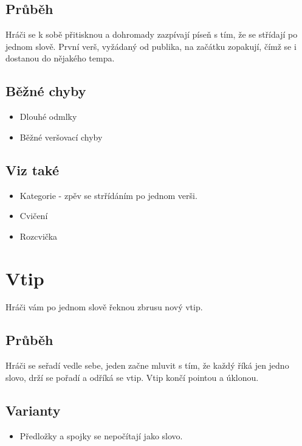 \documentclass[main.tex]{subfiles}
\begin{document}
\subsection{Průběh} Hráči se k sobě přitisknou a dohromady zazpívají píseň s tím, že se střídají po jednom slově. První verš, vyžádaný od publika, na začátku zopakují, čímž se i dostanou do nějakého tempa.  
 
\subsection{Běžné chyby} \begin{itemize}
\item Dlouhé odmlky
\item Běžné veršovací chyby
\end{itemize}
 
\subsection{Viz také} \begin{itemize}
\item Kategorie  - zpěv se strřídáním po jednom verši.
\item Cvičení 
\item Rozcvička 
\end{itemize}
 
 
 
 
\needspace{5cm} \section{Vtip} \label{vtip}  
Hráči vám po jednom slově řeknou zbrusu nový vtip. 
\subsection{Průběh} Hráči se seřadí vedle sebe, jeden začne mluvit s tím, že každý říká jen jedno slovo, drží se pořadí a odříká se vtip.  Vtip končí pointou a úklonou. 
\subsection{Varianty} \begin{itemize}
\item Předložky a spojky se nepočítají jako slovo.
\end{itemize}
 
\end{document}
